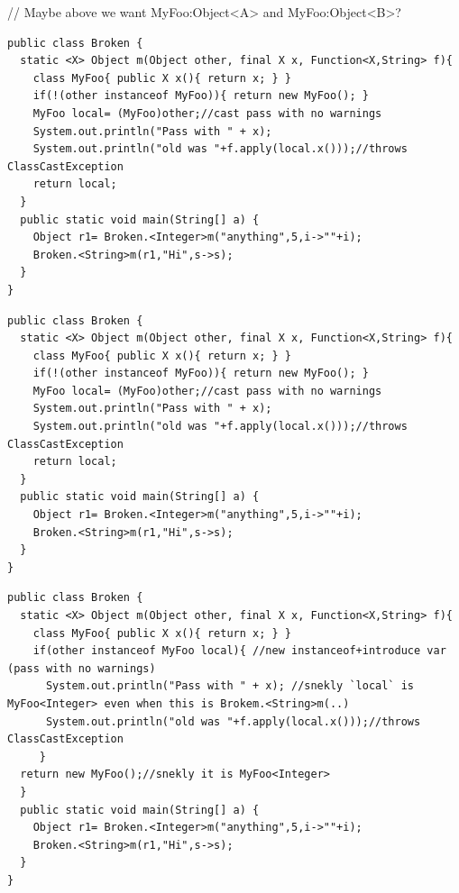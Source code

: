 // Maybe above we want MyFoo:Object<A> and MyFoo:Object<B>?

\begin{lstlisting}
public class Broken {
  static <X> Object m(Object other, final X x, Function<X,String> f){
    class MyFoo{ public X x(){ return x; } }
    if(!(other instanceof MyFoo)){ return new MyFoo(); }
    MyFoo local= (MyFoo)other;//cast pass with no warnings
    System.out.println("Pass with " + x);
    System.out.println("old was "+f.apply(local.x()));//throws ClassCastException
    return local;
  }
  public static void main(String[] a) {
    Object r1= Broken.<Integer>m("anything",5,i->""+i);
    Broken.<String>m(r1,"Hi",s->s);
  }
}
\end{lstlisting}

\begin{lstlisting}
public class Broken {
  static <X> Object m(Object other, final X x, Function<X,String> f){
    class MyFoo{ public X x(){ return x; } }
    if(!(other instanceof MyFoo)){ return new MyFoo(); }
    MyFoo local= (MyFoo)other;//cast pass with no warnings
    System.out.println("Pass with " + x);
    System.out.println("old was "+f.apply(local.x()));//throws ClassCastException
    return local;
  }
  public static void main(String[] a) {
    Object r1= Broken.<Integer>m("anything",5,i->""+i);
    Broken.<String>m(r1,"Hi",s->s);
  }
}
\end{lstlisting}

\begin{lstlisting}
public class Broken {
  static <X> Object m(Object other, final X x, Function<X,String> f){
    class MyFoo{ public X x(){ return x; } }
    if(other instanceof MyFoo local){ //new instanceof+introduce var (pass with no warnings)
      System.out.println("Pass with " + x); //snekly `local` is MyFoo<Integer> even when this is Brokem.<String>m(..)
      System.out.println("old was "+f.apply(local.x()));//throws ClassCastException    
     }
  return new MyFoo();//snekly it is MyFoo<Integer>
  }
  public static void main(String[] a) {
    Object r1= Broken.<Integer>m("anything",5,i->""+i);
    Broken.<String>m(r1,"Hi",s->s);
  }
}
\end{lstlisting}

